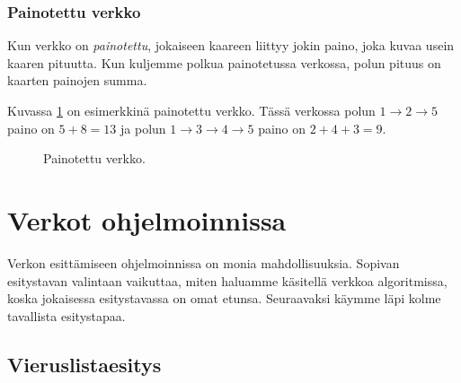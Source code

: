 \subsubsection{Painotettu verkko}

Kun verkko on \emph{painotettu},
jokaiseen kaareen liittyy jokin paino,
joka kuvaa usein kaaren pituutta.
Kun kuljemme polkua painotetussa verkossa,
polun pituus on kaarten painojen summa.

Kuvassa \ref{fig:verpai} on esimerkkinä painotettu verkko.
Tässä verkossa polun $1 \rightarrow 2 \rightarrow 5$
paino on $5+8=13$ ja polun
$1 \rightarrow 3 \rightarrow 4 \rightarrow 5$
paino on $2+4+3=9$.

\begin{figure}
\center
\begin{center}
\end{center}
\caption{Painotettu verkko.}
\label{fig:verpai}
\end{figure}


\section{Verkot ohjelmoinnissa}

Verkon esittämiseen ohjelmoinnissa on monia mahdollisuuksia.
Sopivan esitystavan valintaan vaikuttaa,
miten haluamme käsitellä verkkoa algoritmissa,
koska jokaisessa esitystavassa on omat etunsa.
Seuraavaksi käymme läpi kolme tavallista esitystapaa.

\subsection{Vieruslistaesitys}

